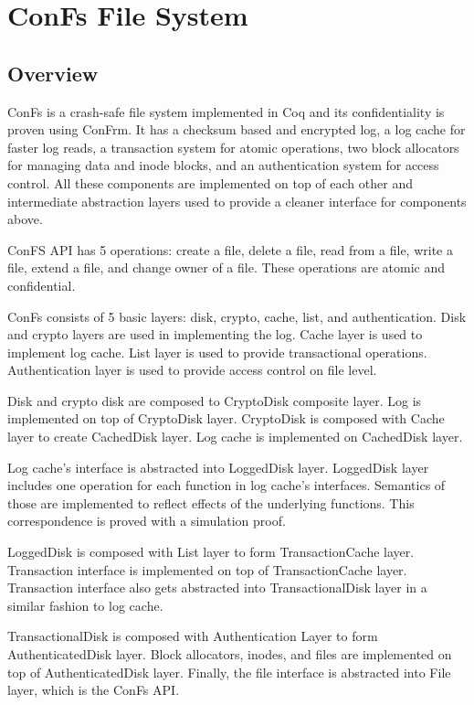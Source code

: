 \chapter{ConFs File System}

\section{Overview}
ConFs is a crash-safe file system implemented in Coq and its confidentiality is proven using ConFrm. It has a checksum based and encrypted log, a log cache for faster log reads, a transaction system for atomic operations, two block allocators for managing data and inode blocks, and an authentication system for access control. All these components are implemented on top of each other and intermediate abstraction layers used to provide a cleaner interface for components above.

ConFS API has 5 operations: create a file, delete a file, read from a file, write a file, extend a file, and change owner of a file. These operations are atomic and confidential.

ConFs consists of 5 basic layers: disk, crypto, cache, list, and authentication. Disk and crypto layers are used in implementing the log. Cache layer is used to implement log cache. List layer is used to provide transactional operations. Authentication layer is used to provide access control on file level.

Disk and crypto disk are composed to CryptoDisk composite layer. Log is implemented on top of CryptoDisk layer. CryptoDisk is composed with Cache layer to create CachedDisk layer. Log cache is implemented on CachedDisk layer.

Log cache's interface is abstracted into LoggedDisk layer. LoggedDisk layer includes one operation for each function in log cache's interfaces. Semantics of those are implemented to reflect effects of the underlying functions. This correspondence is proved with a simulation proof.

LoggedDisk is composed with List layer to form TransactionCache layer. Transaction interface is implemented on top of TransactionCache layer. Transaction interface also gets abstracted into TransactionalDisk layer in a similar fashion to log cache.

TransactionalDisk is composed with Authentication Layer to form AuthenticatedDisk layer. Block allocators, inodes, and files are implemented on top of AuthenticatedDisk layer. Finally, the file interface is abstracted into File layer, which is the ConFs API.


